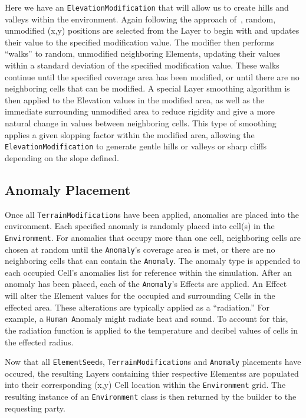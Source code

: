 Here we have an \texttt{ElevationModification} that will allow us to create hills and valleys within the environment.
Again following the approach of~\cite{doran_controlled_2010}, random, unmodified (x,y) positions are selected from the Layer to begin with and updates their value to the specified modification value.
The modifier then performs ``walks'' to random, unmodified neighboring Elements, updating their values within a standard deviation of the specified modification value.
These walks continue until the specified coverage area has been modified, or until there are no neighboring cells that can be modified.
A special Layer smoothing algorithm is then applied to the Elevation values in the modified area, as well as the immediate surrounding unmodified area to reduce rigidity and give a more natural change in values between neighboring cells.
This type of smoothing applies a given slopping factor within the modified area, allowing the \texttt{ElevationModification} to generate gentle hills or valleys or sharp cliffs depending on the slope defined.


\subsection{Anomaly Placement} \label{subsec:anomaly_placement}
Once all \texttt{TerrainModification}s have been applied, anomalies are placed into the environment.
Each specified anomaly is randomly placed into cell(s) in the \texttt{Environment}.
For anomalies that occupy more than one cell, neighboring cells are chosen at random until the \texttt{Anomaly}'s coverage area is met, or there are no neighboring cells that can contain the \texttt{Anomaly}.
The anomaly type is appended to each occupied Cell's anomalies list for reference within the simulation.
After an anomaly has been placed, each of the \texttt{Anomaly}'s Effects are applied.
An Effect will alter the Element values for the occupied and surrounding Cells in the effected area.
These alterations are typically applied as a ``radiation.''
For example, a \texttt{Human A}nomaly might radiate heat and sound.
To account for this, the radiation function is applied to the temperature and decibel values of cells in the effected radius.

Now that all \texttt{ElementSeed}s, \texttt{TerrainModification}s and \texttt{Anomaly} placements have occured, the resulting Layers containing thier respective Elementss are populated into their corresponding (x,y) Cell location within the \texttt{Environment} grid.
The resulting instance of an \texttt{Environment} class is then returned by the builder to the requesting party.




